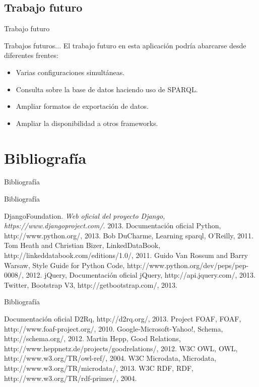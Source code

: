 \documentclass[spanish,xcolor=table,svgnames]{beamer}
\begin{document}
\subsection*{Trabajo futuro}
\begin{frame}{Trabajo futuro}
\begin{block}{Trabajos futuros...}
El trabajo futuro en esta aplicación podría abarcarse desde diferentes frentes:
\begin{itemize}
\item Varias configuraciones simultáneas.
\item Consulta sobre la base de datos haciendo uso de SPARQL.
\item Ampliar formatos de exportación de datos.
\item Ampliar la disponibilidad a otros frameworks.
\end{itemize}
\end{block}
\end{frame}

\section{Bibliografía}
\begin{frame}{Bibliografía}
  \tableofcontents[currentsection]
\end{frame}

\begin{frame}{Bibliografía}
  \begin{thebibliography}{10}
    \beamertemplatebookbibitems
     DjangoFoundation. \emph{Web oficial del proyecto Django, https://www.djangoproject.com/}. 2013.
     Documentación oficial Python, http://www.python.org/, 2013.
     Bob DuCharme, Learning sparql, O’Reilly, 2011.
     Tom Heath and Christian Bizer, LinkedDataBook, http://linkeddatabook.com/editions/1.0/, 2011.
     Guido Van Rossum and Barry Warsaw, Style Guide for Python Code, http://www.python.org/dev/peps/pep-0008/, 2012.
     jQuery, Documentación oficial jQuery, http://api.jquery.com/, 2013.
     Twitter, Bootstrap V3, http://getbootstrap.com/, 2013.
  \end{thebibliography} 
\end{frame}

\begin{frame}{Bibliografía}
  \begin{thebibliography}{10}
    \beamertemplatebookbibitems
     Documentación oficial D2Rq, http://d2rq.org/, 2013.
     Project FOAF, FOAF, http://www.foaf-project.org/, 2010.
     Google-Microsoft-Yahoo!, Schema, http://schema.org/, 2012.
     Martin Hepp, Good Relations, http://www.heppnetz.de/projects/goodrelations/, 2012.
     W3C OWL, OWL, http://www.w3.org/TR/owl-ref/, 2004.
     W3C Microdata, Microdata, http://www.w3.org/TR/microdata/, 2013.
     W3C RDF, RDF, http://www.w3.org/TR/rdf-primer/, 2004.
  \end{thebibliography} 
\end{frame}
\end{document}
